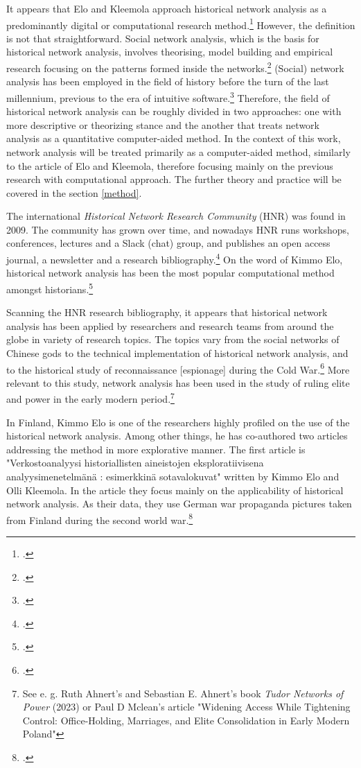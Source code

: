 It appears that Elo and Kleemola approach historical network analysis as a predominantly digital or computational research method.\footcite[pp. 415-417.]{eloAklee15} However, the definition is not that straightforward. Social network analysis, which is the basis for historical network analysis, involves theorising, model building and empirical research focusing on the patterns formed inside the networks.\footcite[pp. 22-24.]{Keats-R2007} (Social) network analysis has been employed in the field of history before the turn of the last millennium, previous to the era of intuitive software.\footcite{AronssonEtA1999} Therefore, the field of historical network analysis can be roughly divided in two approaches: one with more descriptive or theorizing stance and the another that treats network analysis as a quantitative computer-aided method. In the context of this work, network analysis will be treated primarily as a computer-aided method, similarly to the article of Elo and Kleemola, therefore focusing mainly on the previous research with computational approach. The further theory and practice will be covered in the section \ref{method}.

The international \textit{Historical Network Research Community} (HNR) was found in 2009. The community has grown over time, and nowadays HNR runs workshops, conferences, lectures and a Slack (chat) group, and publishes an open access journal, a newsletter and a research bibliography.\footcite{hnr} On the word of Kimmo Elo, historical network analysis has been the most popular computational method amongst historians.\footcite[p. 22.]{elo16} 

Scanning the HNR research bibliography, it appears that historical network analysis has been applied by researchers and research teams from around the globe in variety of research topics. The topics vary from the social networks of Chinese gods to the technical implementation of historical network analysis, and to the historical study of reconnaissance [espionage] during the Cold War.\footcites[p. 22.]{elo16}{hnrbib} More relevant to this study, network analysis has been used in the study of ruling elite and power in the early modern period.\footnote{See e. g. Ruth Ahnert's and Sebastian E. Ahnert's book \textit{Tudor Networks of Power} (2023) or Paul D Mclean's article "Widening Access While Tightening Control: Office-Holding, Marriages, and Elite Consolidation in Early Modern Poland"} 
 
In Finland, Kimmo Elo is one of the researchers highly profiled on the use of the historical network analysis. Among other things, he has co-authored two articles addressing the method in more explorative manner. The first article is "Verkostoanalyysi historiallisten aineistojen eksploratiivisena analyysimenetelmänä : esimerkkinä sotavalokuvat" written by Kimmo Elo and Olli Kleemola. In the article they focus mainly on the applicability of historical network analysis. As their data, they use German war propaganda pictures taken from Finland during the second world war.\footcite{eloAklee15}

